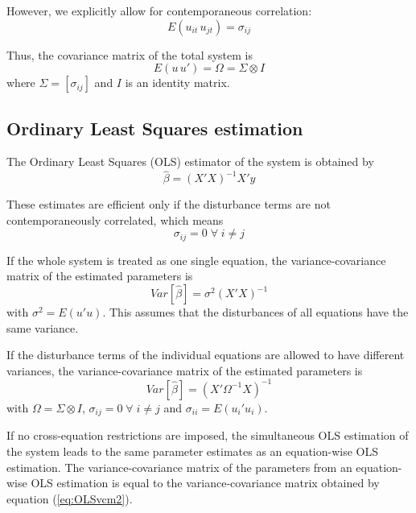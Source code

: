 However, we explicitly allow for contemporaneous correlation:
\begin{equation}
   E \left( u_{it} \, u_{jt} \right) = \sigma_{ij}
\end{equation}

Thus, the covariance matrix of the total system is
\begin{equation}
   E \left( u \, u' \right) = \Omega = \Sigma \otimes I
\end{equation}
where $\Sigma = \left[ \sigma_{ij} \right]$ and $I$ is an
identity matrix.


\subsection{Ordinary Least Squares estimation}

The Ordinary Least Squares (OLS) estimator of the system 
is obtained by
\begin{equation}
   \widehat{\beta} = \left( X'X \right)^{-1} X'y
\end{equation}

These estimates are efficient only if the disturbance terms are not 
contemporaneously correlated, which means 
\begin{equation}
   \sigma_{ij} = 0 \; \forall \; i \neq j
\end{equation}

If the whole system is treated as one single equation, 
the variance-covariance matrix of the estimated parameters is
\begin{equation}
   Var \left[ \widehat{\beta} \right] = \sigma^2 \left( X'X \right)^{-1}
\end{equation}
with $\sigma^2 = E \left( u' u \right)$.
This assumes that the disturbances of all equations have the
same variance.

If the disturbance terms of the individual equations 
are allowed to have different variances, 
the variance-covariance matrix of the estimated parameters is
\begin{equation}
   Var \left[ \widehat{\beta} \right] = \left( X' \Omega^{-1} X \right)^{-1}
   \label{eq:OLSvcm2}
\end{equation}
with $\Omega = \Sigma \otimes I$, 
$\sigma_{ij} = 0 \; \forall \; i \neq j$ and
$\sigma_{ii} = E \left( u_i' u_i \right)$.

If no cross-equation restrictions are imposed, the simultaneous 
OLS estimation of the system leads to the same parameter estimates 
as an equation-wise OLS estimation. The variance-covariance matrix 
of the parameters from an equation-wise OLS estimation is equal to 
the variance-covariance matrix obtained by equation 
(\ref{eq:OLSvcm2}).


